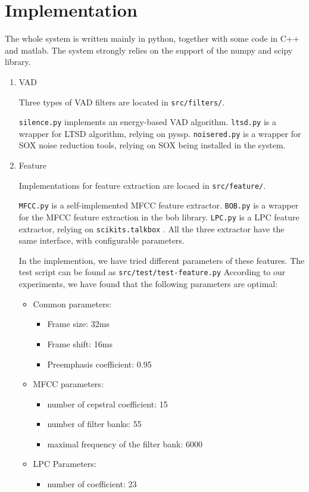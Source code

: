 
\section{Implementation}
The whole system is written mainly in python, together with some code in C++ and matlab.
The system strongly relies on the support of the numpy\cite{numpy} and scipy\cite{scipy} library.

\begin{enumerate}
    \item VAD

      Three types of  VAD filters are located in \verb|src/filters/|.

      \verb|silence.py| implements an energy-based VAD algorithm.
      \verb|ltsd.py| is a wrapper for LTSD algorithm, relying on pyssp\cite{pyssp}.
      \verb|noisered.py| is a wrapper for SOX noise reduction tools, relying on SOX \cite{sox} being
      installed in the system.

    \item Feature

      Implementations for feature extraction are locaed in \verb|src/feature/|.

      \verb|MFCC.py| is a self-implemented MFCC feature extractor.
      \verb|BOB.py| is a wrapper for the MFCC feature extraction in the bob \cite{bob2012} library.
      \verb|LPC.py| is a LPC feature extractor, relying on \verb|scikits.talkbox| \cite{talkbox}.
      All the three extractor have the same interface, with configurable parameters.

      In the implemention, we have  tried different parameters of these features.
      The test script can be found as \verb|src/test/test-feature.py|
      According to our experiments, we have found that the following parameters are optimal:
      \begin{itemize}
        \item Common parameters:
          \begin{itemize}
            \item Frame size: 32ms
            \item Frame shift: 16ms
            \item Preemphasis coefficient: 0.95
          \end{itemize}
        \item MFCC parameters:
          \begin{itemize}
            \item number of cepstral coefficient: 15
            \item number of filter banks: 55
            \item maximal frequency of the filter bank: 6000
          \end{itemize}
        \item LPC Parameters:
          \begin{itemize}
            \item number of coefficient: 23
          \end{itemize}
      \end{itemize}


\end{enumerate}
